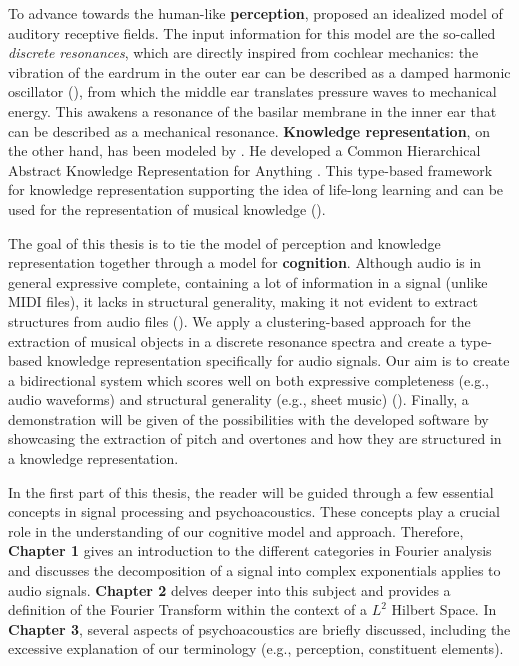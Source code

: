 To advance towards the human-like \textbf{perception}, \textcite{homer_modelling_2023} proposed an idealized model of auditory receptive fields. The input information for this model are the so-called \textit{discrete resonances}, which are directly inspired from cochlear mechanics: the vibration of the eardrum in the outer ear can be described as a damped harmonic oscillator (\cite{chung_hearing_1981}), from which the middle ear translates pressure waves to mechanical energy. This awakens a resonance of the basilar membrane in the inner ear that can be described as a mechanical resonance. \textbf{Knowledge representation}, on the other hand, has been modeled by \textcite{harley_abstract_2020}. He developed a Common Hierarchical Abstract Knowledge Representation for Anything \parencite[CHAKRA]{harley_chakra_2022}. This type-based framework for knowledge
representation supporting the idea of life-long learning and can be used for the representation of musical knowledge (\cite{wiggins_representing_1989}).

The goal of this thesis is to tie the model of perception and knowledge representation together through a model for \textbf{cognition}. Although audio is in general expressive complete, containing a lot of information in a signal (unlike MIDI files), it lacks in structural generality, making it not evident to extract structures from audio files (\cite{wiggins_creativity_2020}).
We apply a clustering-based approach for the extraction of musical objects in a discrete resonance spectra and create a type-based knowledge representation specifically for audio signals. Our aim is to create a bidirectional system which scores well on both expressive completeness (e.g., audio waveforms) and structural generality (e.g., sheet music) (\cite{wiggins_representing_1989, collins_expressive_2018}). Finally, a demonstration will be given of the possibilities with the developed software by showcasing the extraction of pitch and overtones and how they are structured in a knowledge representation.

In the first part of this thesis, the reader will be guided through a few essential concepts in signal processing and psychoacoustics. These concepts play a crucial role in the understanding of our cognitive model and approach. Therefore, \textbf{Chapter 1} gives an introduction to the different categories in Fourier analysis and discusses the decomposition of a signal into complex exponentials applies to audio signals. \textbf{Chapter 2} delves deeper into this subject and provides a definition of the Fourier Transform within the context of a $L^2$ Hilbert Space. In \textbf{Chapter 3}, several aspects of psychoacoustics are briefly discussed, including the excessive explanation of our terminology (e.g., perception, constituent elements). 

